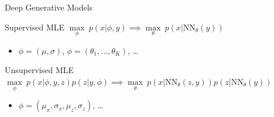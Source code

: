 \documentclass[14pt, aspectratio=169]{beamer}\usepackage[]{graphicx}\usepackage[]{color}
\begin{document}
\begin{frame}{Deep Generative Models}
\begin{block}{Supervised MLE}
$ \underset{\phi}{\max}~p(x|\phi,y) \implies \underset{\theta}{\max}~p\left(x|\text{NN}_{\theta}(y)\right) $
\begin{itemize}
\item $ \phi = (\mu, \sigma) $, $ \phi = (\theta_{1}, \ldots, \theta_{K}) $, \ldots
\end{itemize}
\end{block}
\pause
\begin{block}{Unsupervised MLE}
$ \underset{\phi}{\max}~p(x|\phi,y, z)p(z|y, \phi) \implies \underset{\theta}{\max}~p\left(x|\text{NN}_{\theta}(z,y)\right) p\left(z|\text{NN}_{\theta}(y)\right) $
\begin{itemize}
\item $ \phi = (\mu_{x}, \sigma_{x}, \mu_{z}, \sigma_{z}) $, \ldots
\end{itemize}
\end{block}
\end{frame}

%
%
%
%
%
%
\end{document}
